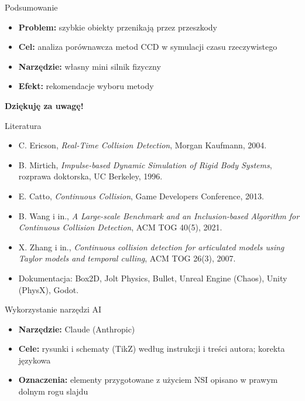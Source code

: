 \documentclass[aspectratio=169, 11pt]{beamer}
\begin{document}
\begin{frame}{Podsumowanie}
  \begin{itemize}\itemsep0.5em
    \item \textbf{Problem:} szybkie obiekty przenikają przez przeszkody
    \item \textbf{Cel:} analiza porównawcza metod CCD w symulacji czasu rzeczywistego
    \item \textbf{Narzędzie:} własny mini silnik fizyczny
    \item \textbf{Efekt:} rekomendacje wyboru metody
  \end{itemize}
  \vspace{0.8cm}
  \begin{center}
    {\Large\color{PwrRed}\bfseries Dziękuję za uwagę!}
  \end{center}
\end{frame}
 
\begin{frame}{Literatura}
  \footnotesize
  \begin{itemize}\itemsep0.2em
    \item C. Ericson, \textit{Real-Time Collision Detection}, Morgan Kaufmann, 2004.
    \item B. Mirtich, \textit{Impulse-based Dynamic Simulation of Rigid Body Systems}, rozprawa doktorska, UC Berkeley, 1996.
    \item E. Catto, \textit{Continuous Collision}, Game Developers Conference, 2013.
    \item B. Wang i in., \textit{A Large-scale Benchmark and an Inclusion-based Algorithm for Continuous Collision Detection}, ACM TOG 40(5), 2021.
    \item X. Zhang i in., \textit{Continuous collision detection for articulated models using Taylor models and temporal culling}, ACM TOG 26(3), 2007.
    \item Dokumentacja: Box2D, Jolt Physics, Bullet, Unreal Engine (Chaos), Unity (PhysX), Godot.
  \end{itemize}
\end{frame}

\begin{frame}{Wykorzystanie narzędzi AI}
  \begin{itemize}\itemsep0.4em
    \item \textbf{Narzędzie:} Claude (Anthropic)
    \item \textbf{Cele:} rysunki i schematy (TikZ)
          według instrukcji i treści autora; korekta językowa
    \item \textbf{Oznaczenia:} elementy przygotowane z użyciem NSI opisano w prawym dolnym rogu slajdu
  \end{itemize}
\end{frame}
\end{document}
